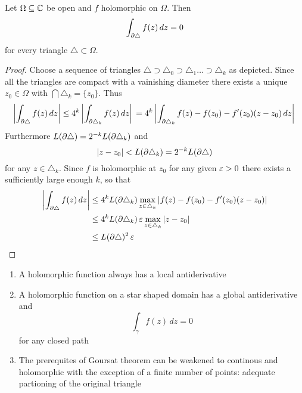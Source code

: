 \begin{theorem}[Goursat]\label{thm:thm_goursat}
Let \( \Omega \subseteq \mathbb{C} \) be open and \( f \) holomorphic on \( \Omega \). 
Then
	\[
		\int_{\partial\triangle} f(z)\,dz = 0
	\]
for every triangle \( \triangle \subset \Omega \).
\end{theorem}

\begin{proof}
Choose a sequence of triangles \( \triangle \supset \triangle_0 \supset \triangle_1 \dots \supset \triangle_k \) 
as depicted. Since all the triangles are compact with a vainishing diameter there exists a unique \( z_0 \in \Omega \) with \( \bigcap \triangle_k = \{ z_0 \}  \). Thus
\[
	\left| \int_{\partial\triangle} f(z)\,dz \right| 
		\le 4^k \left| \int_{\partial\triangle_k} f(z)\,dz \right| \\
		= 4^k \left| \int_{\partial\triangle_k} f(z) - f(z_0) - f'(z_0)(z - z_0)\,dz \right| \\
\]
Furthermore \( L(\partial\triangle) = 2^{-k} L(\partial\triangle_k) \) and 
\[
	|z - z_0| < L(\partial\triangle_k) = 2^{-k} L(\partial\triangle)
\]
for any \( z \in \triangle_k \). Since \( f \) is holomorphic at \( z_0 \) for any given \( \varepsilon > 0 \) 
there exists a sufficiently large enough \( k \), so that
\[
	\begin{split}
		\left| \int_{\partial\triangle} f(z)\,dz \right| 
			& \le 4^k L(\partial\triangle_k) \max_{z \in \triangle_k} |f(z) - f(z_0) - f'(z_0)(z - z_0)| \\
			& \le 4^k L(\partial\triangle_k) \,\varepsilon \max_{z \in \triangle_k} |z - z_0| \\
			& \le L(\partial\triangle)^2 \,\varepsilon
	\end{split}
\]
\end{proof}
\bigskip


\begin{corollary}\hfill
    \begin{enumerate}
        \item A holomorphic function always has a local antiderivative 
        \item A holomorphic function on a star shaped domain has a global antiderivative and 
			\[
				\int_{\gamma} f(z)\,dz = 0
			\]
			for any closed path
        \item The prerequites of Goursat theorem can be weakened to continous and holomorphic with 
			the exception of a finite number of points: adequate partioning of the original triangle
    \end{enumerate}
\end{corollary}
\bigskip


